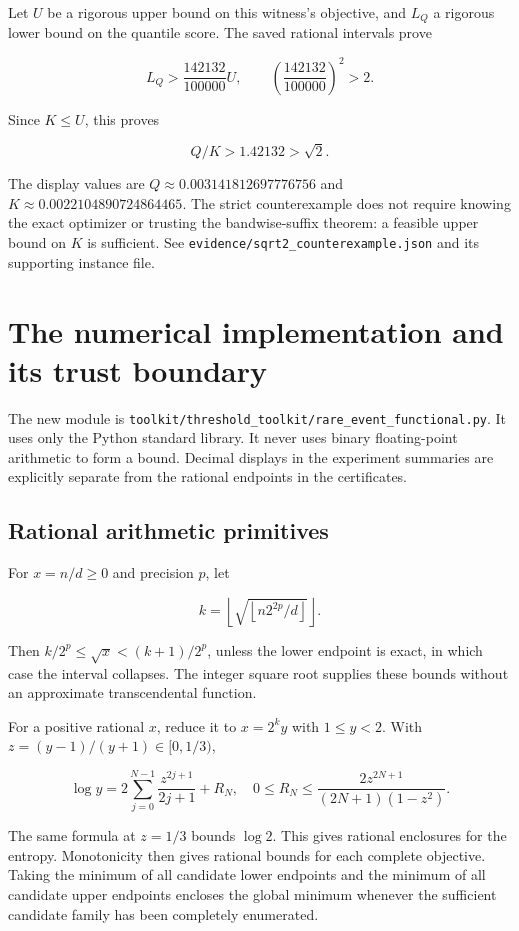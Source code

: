 \documentclass[
  11pt,
  a4paper,
]{article}
\begin{document}
Let \(U\) be a rigorous upper bound on this witness's objective, and
\(L_Q\) a rigorous lower bound on the quantile score. The saved rational
intervals prove

\[
L_Q>\frac{142132}{100000}U,
\qquad \left(\frac{142132}{100000}\right)^2>2.
\]

Since \(K\le U\), this proves

\[
Q/K>1.42132>\sqrt2.
\]

The display values are \(Q\approx0.003141812697776756\) and
\(K\approx0.0022104890724864465\). The strict counterexample does not
require knowing the exact optimizer or trusting the bandwise-suffix
theorem: a feasible upper bound on \(K\) is sufficient. See
\texttt{evidence/sqrt2\_counterexample.json} and its supporting instance
file.

\section{The numerical implementation and its trust
boundary}\label{the-numerical-implementation-and-its-trust-boundary}

The new module is
\texttt{toolkit/threshold\_toolkit/rare\_event\_functional.py}. It uses
only the Python standard library. It never uses binary floating-point
arithmetic to form a bound. Decimal displays in the experiment summaries
are explicitly separate from the rational endpoints in the certificates.

\subsection{Rational arithmetic
primitives}\label{rational-arithmetic-primitives}

For \(x=n/d\ge0\) and precision \(p\), let

\[
k=\left\lfloor\sqrt{\left\lfloor n2^{2p}/d\right\rfloor}\right\rfloor.
\]

Then \(k/2^p\le\sqrt{x}<(k+1)/2^p\), unless the lower endpoint is exact,
in which case the interval collapses. The integer square root supplies
these bounds without an approximate transcendental function.

For a positive rational \(x\), reduce it to \(x=2^ky\) with
\(1\le y<2\). With \(z=(y-1)/(y+1)\in[0,1/3)\),

\[
\log y=2\sum_{j=0}^{N-1}\frac{z^{2j+1}}{2j+1}+R_N,
\quad
0\le R_N\le\frac{2z^{2N+1}}{(2N+1)(1-z^2)}.
\]

The same formula at \(z=1/3\) bounds \(\log2\). This gives rational
enclosures for the entropy. Monotonicity then gives rational bounds for
each complete objective. Taking the minimum of all candidate lower
endpoints and the minimum of all candidate upper endpoints encloses the
global minimum whenever the sufficient candidate family has been
completely enumerated.
\end{document}
